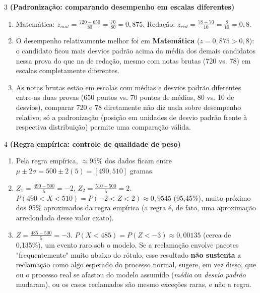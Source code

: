 \documentclass[11pt]{article}
\begin{document}
\begin{questao}{3} \textbf{(Padronização: comparando desempenho em escalas diferentes)}
\begin{solucao}
\begin{enumerate}[label=(\alph*)]
  \item Matemática: $z_{mat} = \frac{720-650}{80} = \frac{70}{80}=0{,}875$.
    Redação: $z_{red} = \frac{78-70}{10} = \frac{8}{10}=0{,}8$.
  \item O desempenho relativamente melhor foi em \textbf{Matemática} ($z=0{,}875 > 0{,}8$): o
    candidato ficou mais desvios padrão acima da média dos demais candidatos nessa prova do que
    na de redação, mesmo com notas brutas (720 vs. 78) em escalas completamente diferentes.
  \item As notas brutas estão em escalas com médias e desvios padrão diferentes entre as duas
    provas (650 pontos vs. 70 pontos de médias, 80 vs. 10 de desvios), comparar 720 e 78
    diretamente não diz nada sobre desempenho relativo; só a padronização (posição em unidades de
    desvio padrão frente à respectiva distribuição) permite uma comparação válida.
\end{enumerate}
\end{solucao}
\end{questao}

\begin{questao}{4} \textbf{(Regra empírica: controle de qualidade de peso)}
\begin{solucao}
\begin{enumerate}[label=(\alph*)]
  \item Pela regra empírica, $\approx95\%$ dos dados ficam entre $\mu\pm2\sigma =
    500\pm2(5) = [490, 510]$ gramas.
  \item $Z_1=\frac{490-500}{5}=-2$, $Z_2=\frac{510-500}{5}=2$.
    $P(490<X<510)=P(-2<Z<2)\approx0{,}9545$ (95,45\%), muito próximo dos 95\% aproximados da
    regra empírica (a regra é, de fato, uma aproximação arredondada desse valor exato).
  \item $Z=\frac{485-500}{5}=-3$. $P(X<485)=P(Z<-3)\approx0{,}00135$ (cerca de 0,135\%), um
    evento raro sob o modelo. Se a reclamação envolve pacotes "frequentemente" muito abaixo do
    rótulo, esse resultado \textbf{não sustenta} a reclamação como algo esperado do processo
    normal, sugere, em vez disso, que ou o processo real se afastou do modelo assumido
    (\emph{média} ou \emph{desvio padrão} mudaram), ou os casos reclamados são mesmo exceções
    raras, e não a regra.
\end{enumerate}
\end{solucao}
\end{questao}
\end{document}
